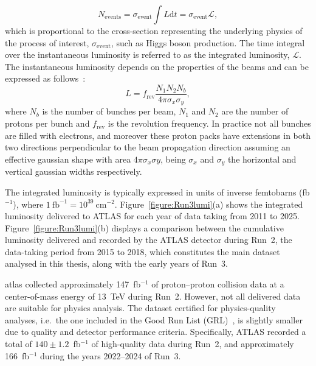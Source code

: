 \begin{equation}
  N_\text{{events}} = \sigma_{\text{event}} \int L\text{d}t = \sigma_{\text{event}}\mathcal{L},
\end{equation}
which is proportional to the cross-section representing the underlying physics of the process of interest, $\sigma_{\text{event}}$, such as Higgs boson production. The time integral over the instantaneous luminosity is referred to as the integrated luminosity, $\mathcal{L}$. The instantaneous luminosity depends on the properties of the beams and can be expressed as follows~\cite{Aad_2023}:
\begin{equation}
    L = f_{\text{rev}}\frac{N_1 N_2 N_b}{4\pi \sigma_x \sigma_y},
\end{equation}
where $N_b$ is the number of bunches per beam, $N_1$ and $N_2$ are the number of protons per bunch and $f_{\text{rev}}$ is the revolution frequency. In practice not all bunches are filled with electrons, and moreover these proton packs have extensions in both two directions perpendicular to the beam propagation direction assuming an effective gaussian shape with area $4\pi\sigma_{x}\sigma{y}$, being $\sigma_{x}$ and $\sigma_{y}$ the horizontal and vertical gaussian widths respectively.  

The integrated luminosity is typically expressed in units of inverse femtobarns (fb$^{-1}$), where $1~\text{fb}^{-1} = 10^{39}~\text{cm}^{-2}$. Figure~\ref{figure:Run3lumi}(a) shows the integrated luminosity delivered to ATLAS for each year of data taking from 2011 to 2025. Figure~\ref{figure:Run3lumi}(b) displays a comparison between the cumulative luminosity delivered and recorded by the ATLAS detector during Run~2, the data-taking period from 2015 to 2018, which constitutes the main dataset analysed in this thesis, along with the early years of Run~3.

\acrshort{atlas} collected approximately 147~fb$^{-1}$ of proton--proton collision data at a center-of-mass energy of 13~TeV during Run~2. However, not all delivered data are suitable for physics analysis. The dataset certified for physics-quality analyses, i.e.\ the one included in the Good Run List (GRL)~\cite{Aad_2020}, is slightly smaller due to quality and detector performance criteria. Specifically, ATLAS recorded a total of $140 \pm 1.2$~fb$^{-1}$ of high-quality data during Run~2, and approximately 166~fb$^{-1}$ during the years 2022--2024 of Run~3.


